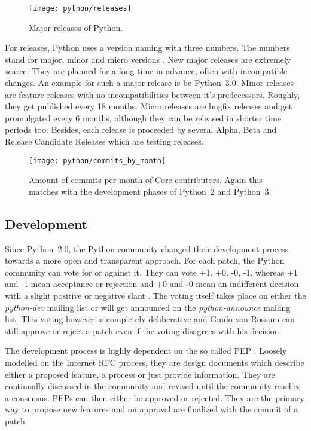 \begin{figure}[htbp]
  \centering
  \texttt{[image: python/releases]}
  \caption[Major releases of Python]{Major releases of Python.}
\end{figure}

For releases, Python uses a version naming with three numbers. The numbers
stand for major, minor and micro versions
\cite{PythonDevelopmentCycle,Warsaw2001}. New major releases are extremely
scarce. They are planned for a long time in advance, often with incompatible
changes. An example for such a major release is be Python~3.0. Minor releases
are feature releases with no incompatibilities between it's predecessors.
Roughly, they get published every 18 months. Micro releases are bugfix releases
and get promulgated every 6 months, although they can be released in shorter
time periods too. Besides, each release is proceeded by several Alpha, Beta and
Release Candidate Releases which are testing releases.

\begin{figure}[htbp]
  \centering
  \texttt{[image: python/commits\_by\_month]}
  \caption[Commits by month, Python]
  {Amount of commits per month of Core contributors. Again this matches with
    the development phases of Python~2 and Python~3.}
\end{figure}


\subsection{Development} %

Since Python~2.0, the Python community changed their development process
towards a more open and transparent approach. For each patch, the Python
community can vote for or against it. They can vote +1, +0, -0, -1, whereas +1
and -1 mean acceptance or rejection and +0 and -0 mean an indifferent decision
with a slight positive or negative slant \cite{Warsaw2002}. The voting itself
takes place on either the \emph{python-dev} mailing list or will get announced
on the \emph{python-announce} mailing list. This voting however is completely
deliberative and Guido van Rossum can still approve or reject a patch even if
the voting disagrees with his decision.

The development process is highly dependent on the so called \ac{PEP}
\cite{Warsaw2000}. Loosely modelled on the Internet \ac{RFC} process, they are
design documents which describe either a proposed feature, a process or just
provide information. They are continually discussed in the community and
revised until the community reaches a consensus. \acp{PEP} can then either be
approved or rejected. They are the primary way to propose new features and on
approval are finalized with the commit of a patch.

